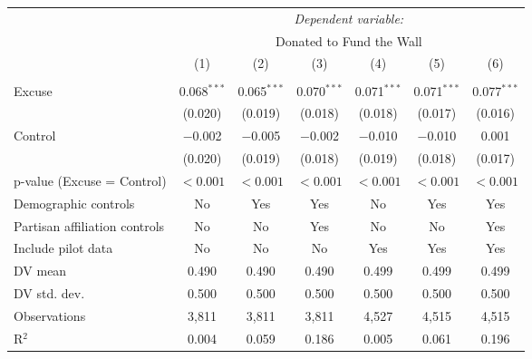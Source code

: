 
\begin{table}[!htbp] \centering 
  \label{t:2-main} 
\begin{threeparttable}
\begin{tabular}{@{\hspace{5pt}}l@{\hspace{5pt}}cccccc} 
\toprule 
 & \multicolumn{6}{c}{\textit{Dependent variable:}} \\ 
\cmidrule(rr){2-7} 
 & \multicolumn{6}{c}{Donated to Fund the Wall} \\ 
 \cmidrule(rr){2-7}
 & (1) & (2) & (3) & (4) & (5) & (6)\\ 
\midrule  
\\[-2.1ex] Excuse & 0.068$^{***}$ & 0.065$^{***}$ & 0.070$^{***}$ & 0.071$^{***}$ & 0.071$^{***}$ & 0.077$^{***}$ \\ 
  & (0.020) & (0.019) & (0.018) & (0.018) & (0.017) & (0.016) \\ 
 \addlinespace 
 Control & $-$0.002 & $-$0.005 & $-$0.002 & $-$0.010 & $-$0.010 & 0.001 \\ 
  & (0.020) & (0.019) & (0.018) & (0.019) & (0.018) & (0.017) \\ 
 \addlinespace 
p-value (Excuse = Control) & $<0.001$ & $<0.001$ & $<0.001$ & $<0.001$ & $<0.001$ & $<0.001$ \\ 
\midrule  
Demographic controls & No & Yes & Yes & No & Yes & Yes \\ 
Partisan affiliation controls & No & No & Yes & No & No & Yes \\ 
\midrule
Include pilot data & No & No & No & Yes & Yes & Yes \\
\addlinespace
DV mean & 0.490 & 0.490 & 0.490 & 0.499 & 0.499 & 0.499 \\
DV std. dev. & 0.500 & 0.500 & 0.500 & 0.500 & 0.500 & 0.500 \\
Observations & 3,811 & 3,811 & 3,811 & 4,527 & 4,515 & 4,515 \\ 
R$^{2}$ & 0.004 & 0.059 & 0.186 & 0.005 & 0.061 & 0.196 \\ 
\bottomrule 
\end{tabular} 
\end{threeparttable}
\end{table} 
